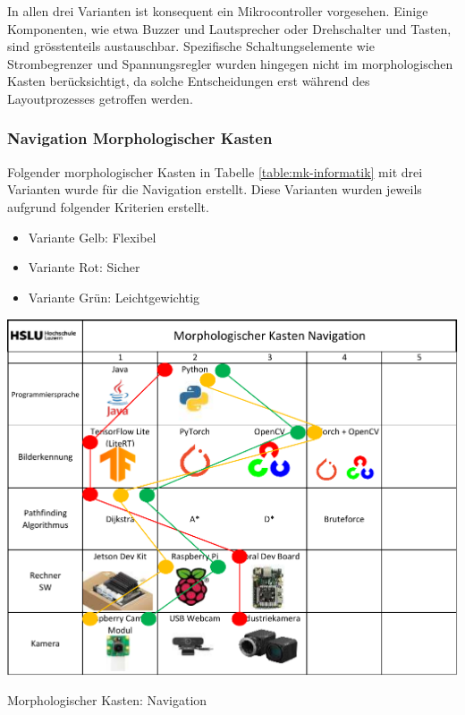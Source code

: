 In allen drei Varianten ist konsequent ein Mikrocontroller vorgesehen. Einige Komponenten, wie etwa Buzzer und Lautsprecher oder Drehschalter und Tasten, sind grösstenteils austauschbar. Spezifische Schaltungselemente wie Strombegrenzer und Spannungsregler wurden hingegen nicht im morphologischen Kasten berücksichtigt, da solche Entscheidungen erst während des Layoutprozesses getroffen werden.


\subsubsection*{Navigation Morphologischer Kasten}


Folgender morphologischer Kasten in Tabelle \ref{table:mk-informatik} mit drei Varianten wurde für die Navigation erstellt.  Diese Varianten wurden jeweils aufgrund folgender Kriterien erstellt.

\begin{itemize}
    \item Variante Gelb: Flexibel
    \item Variante Rot: Sicher
    \item Variante Grün: Leichtgewichtig
\end{itemize}

\begin{table}[H]
\centering
\includegraphics[width=\textwidth]{assets/MK_Informatik.pdf}
\caption{Morphologischer Kasten: Navigation}
\label{table:mk-informatik}
\end{table}


